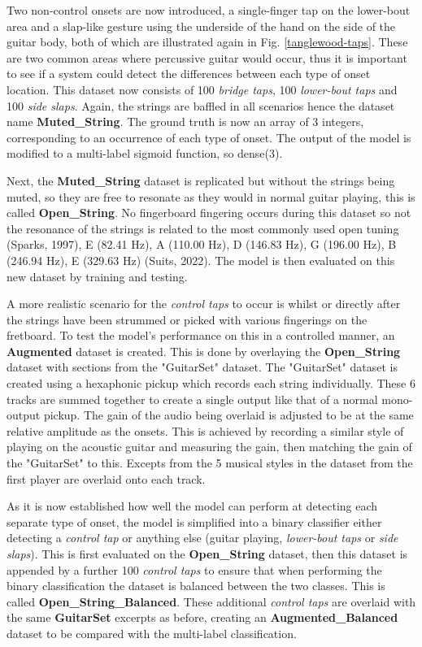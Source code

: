 \documentclass[conference]{IEEEtran}
\begin{document}
Two non-control onsets are now introduced, a single-finger tap on the lower-bout area and a slap-like gesture using the underside of the hand on the side of the guitar body, both of which are illustrated again in Fig. \ref{tanglewood-taps}. These are two common areas where percussive guitar would occur, thus
it is important to see if a system could detect the differences between each type of onset location. This dataset now consists of 100 \emph{bridge taps}, 100 \emph{lower-bout taps} and 100 \emph{side slaps}. Again, the strings are baffled in all scenarios hence the dataset name \textbf{Muted\_String}.
The ground truth is now an array of 3 integers, corresponding to an occurrence of each type of onset. The output of the model is modified to a multi-label sigmoid function, so dense(3). 

Next, the \textbf{Muted\_String} dataset is replicated but without the strings being muted, so they are free to resonate as they would in normal guitar playing, this is called \textbf{Open\_String}. No fingerboard fingering occurs during this dataset so not the resonance of the strings is related 
to the most commonly used open tuning (Sparks, 1997), E (82.41 Hz), A (110.00 Hz), D (146.83 Hz), G (196.00 Hz), B (246.94 Hz), E (329.63 Hz) (Suits, 2022). The model is then evaluated on this new dataset by training and testing.

A more realistic scenario for the \emph{control taps} to occur is whilst or directly after the strings have been strummed or picked with various fingerings on the fretboard. To test the model's performance on this in a controlled manner, an \textbf{Augmented} dataset is created. 
This is done by overlaying the \textbf{Open\_String} dataset with sections from the "GuitarSet" dataset. The "GuitarSet" dataset is created using a hexaphonic pickup which records each string individually. These 6 tracks are summed together
to create a single output like that of a normal mono-output pickup. The gain of the audio being overlaid is adjusted to be at the same relative amplitude as the onsets. This is achieved by recording a similar style of playing on the acoustic guitar and measuring the gain, then matching
the gain of the "GuitarSet" to this. Excepts from the 5 musical styles in the dataset from the first player are overlaid onto each track. 

As it is now established how well the model can perform at detecting each separate type of onset, the model is simplified into a binary classifier either detecting a \emph{control tap} or anything else (guitar playing, \emph{lower-bout taps} or \emph{side slaps}). 
This is first evaluated on the \textbf{Open\_String} dataset, then this dataset is appended by a further 100 \emph{control taps} to ensure that when performing the binary classification the dataset is balanced between the two classes. This is called \textbf{Open\_String\_Balanced}. 
These additional \emph{control taps} are overlaid with the same \textbf{GuitarSet} excerpts as before, creating an \textbf{Augmented\_Balanced} dataset to be compared with the multi-label classification.
\end{document}
